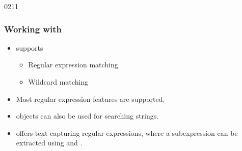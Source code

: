 \begin{slide}[fragile]{0211}\frametitle{Working with }\label{qregexp}
\begin{itemize}
  \item {} supports
  \begin{itemize}
    \item Regular expression matching
    \item Wildcard matching
  \end{itemize}
  \item Most regular expression features are supported.
  \item {} objects can also be used for searching
    strings.
  \item {} offers text capturing regular expressions, where
    a subexpression can be extracted using   and
     .
  \end{itemize}                 
\end{slide}


